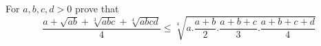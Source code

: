 For $a,b,c,d>0$ prove that $$\frac {a+\sqrt{ab}+\sqrt[3]{abc}+\sqrt[4]{abcd}}{4} \leq \sqrt[4]{a.\frac{a+b}{2}.\frac{a+b+c}{3}.\frac{a+b+c+d}{4}}$$